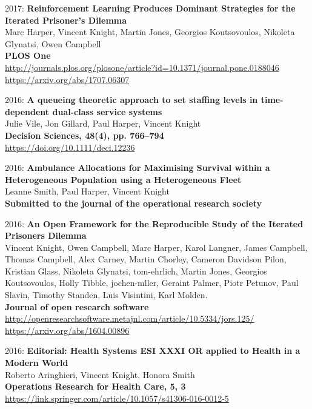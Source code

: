 \documentclass[10pt]{article}
\begin{document}
\begin{etaremune}
\item
  2017: \textbf{Reinforcement Learning Produces Dominant Strategies for the Iterated Prisoner's Dilemma}\\
  Marc Harper, Vincent Knight, Martin Jones, Georgios Koutsovoulos, Nikoleta Glynatsi, Owen Campbell\\
  \textbf{PLOS One}\\
  \url{http://journals.plos.org/plosone/article?id=10.1371/journal.pone.0188046}\\
  \url{https://arxiv.org/abs/1707.06307}\\

\item
  2016: \textbf{A queueing theoretic approach to set staffing levels in time-dependent dual-class service systems}\\
  Julie Vile, Jon Gillard, Paul Harper, Vincent Knight\\
  \textbf{Decision Sciences, 48(4), pp. 766--794}\\
  \url{https://doi.org/10.1111/deci.12236}\\
  

\item
  2016: \textbf{Ambulance Allocations for Maximising Survival within a Heterogeneous Population using a Heterogeneous Fleet}\\
  Leanne Smith, Paul Harper, Vincent Knight\\
  \textbf{Submitted to the journal of the operational research society}\\
  
  

\item
  2016: \textbf{An Open Framework for the Reproducible Study of the Iterated Prisoners Dilemma}\\
  Vincent Knight, Owen Campbell, Marc Harper, Karol Langner, James Campbell, Thomas Campbell, Alex Carney, Martin Chorley, Cameron Davidson Pilon, Kristian Glass, Nikoleta Glynatsi, tom-ehrlich, Martin Jones, Georgios Koutsovoulos, Holly Tibble, jochen-mller, Geraint Palmer, Piotr Petunov, Paul Slavin, Timothy Standen, Luis Visintini, Karl Molden.\\
  \textbf{Journal of open research software}\\
  \url{http://openresearchsoftware.metajnl.com/article/10.5334/jors.125/}\\
  \url{https://arxiv.org/abs/1604.00896}\\

\item
  2016: \textbf{Editorial: Health Systems ESI XXXI  OR applied to Health in a Modern World}\\
  Roberto Aringhieri, Vincent Knight, Honora Smith\\
  \textbf{Operations Research for Health Care, 5, 3}\\
  \url{https://link.springer.com/article/10.1057/s41306-016-0012-5}\\
  


\end{etaremune}
\end{document}
